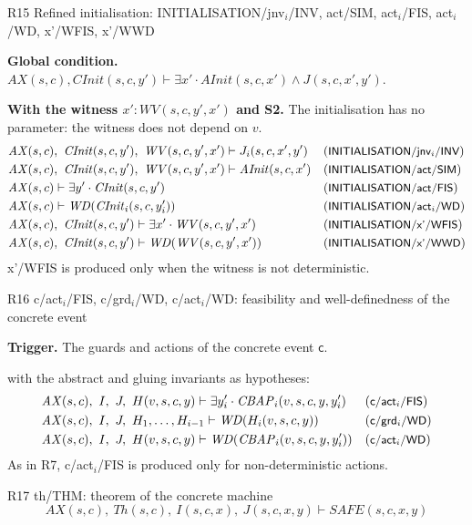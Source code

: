 \documentclass[11pt,a4paper]{article}
\newcommand{\WD}{\mathit{WD}}
\newcommand{\AX}{\mathit{AX}(s,c)}
\newcommand{\Th}{\mathit{Th}}
\newcommand{\po}[1]{\textsf{\small #1}}
\newcommand{\champ}[1]{\par\smallskip\noindent\textbf{#1}\enspace}
\begin{document}
\begin{regle}{R15 \quad Refined initialisation: \po{INITIALISATION/jnv$_i$/INV}, \po{act/SIM}, \po{act$_i$/FIS}, \po{act$_i$/WD}, \po{x'/WFIS}, \po{x'/WWD}}
  \champ{Global condition.}
  $\AX, \mathit{CInit}(s,c,y') \vdash \exists x'\cdot \mathit{AInit}(s,c,x')\wedge J(s,c,x',y')$.
  \champ{With the witness $x' : \mathit{WV}(s,c,y',x')$ and S2.} The initialisation
  has no parameter: the witness does not depend on $v$.
  \begin{align*}
    &\AX,\ \mathit{CInit}(s,c,y'),\ \mathit{WV}(s,c,y',x') \vdash J_i(s,c,x',y') && (\po{INITIALISATION/jnv$_i$/INV})\\
    &\AX,\ \mathit{CInit}(s,c,y'),\ \mathit{WV}(s,c,y',x') \vdash \mathit{AInit}(s,c,x') && (\po{INITIALISATION/act/SIM})\\
    &\AX \vdash \exists y'\cdot \mathit{CInit}(s,c,y') && (\po{INITIALISATION/act/FIS})\\
    &\AX \vdash \WD(\mathit{CInit}_i(s,c,y_i')) && (\po{INITIALISATION/act$_i$/WD})\\
    &\AX,\ \mathit{CInit}(s,c,y') \vdash \exists x'\cdot \mathit{WV}(s,c,y',x') && (\po{INITIALISATION/x'/WFIS})\\
    &\AX,\ \mathit{CInit}(s,c,y') \vdash \WD(\mathit{WV}(s,c,y',x')) && (\po{INITIALISATION/x'/WWD})
  \end{align*}
  \po{x'/WFIS} is produced only when the witness is not deterministic.
\end{regle}

\begin{regle}{R16 \quad \po{c/act$_i$/FIS}, \po{c/grd$_i$/WD}, \po{c/act$_i$/WD}: feasibility and well-definedness of the concrete event}
  \champ{Trigger.} The guards and actions of the concrete event $\mathsf{c}$.
  
  with the abstract and gluing invariants as hypotheses:
  \begin{align*}
    &\AX,\ I,\ J,\ H(v,s,c,y) \vdash \exists y_i'\cdot \mathit{CBAP}_i(v,s,c,y,y_i') && (\po{c/act$_i$/FIS})\\
    &\AX,\ I,\ J,\ H_1,\dots,H_{i-1} \vdash \WD(H_i(v,s,c,y)) && (\po{c/grd$_i$/WD})\\
    &\AX,\ I,\ J,\ H(v,s,c,y) \vdash \WD(\mathit{CBAP}_i(v,s,c,y,y_i')) && (\po{c/act$_i$/WD})
  \end{align*}
  As in R7, \po{c/act$_i$/FIS} is produced only for non-deterministic actions.
\end{regle}

\begin{regle}{R17 \quad \po{th/THM}: theorem of the concrete machine}
  \[ \AX,\ \Th(s,c),\ I(s,c,x),\ J(s,c,x,y) \vdash \mathit{SAFE}(s,c,x,y) \]
\end{regle}
\end{document}
